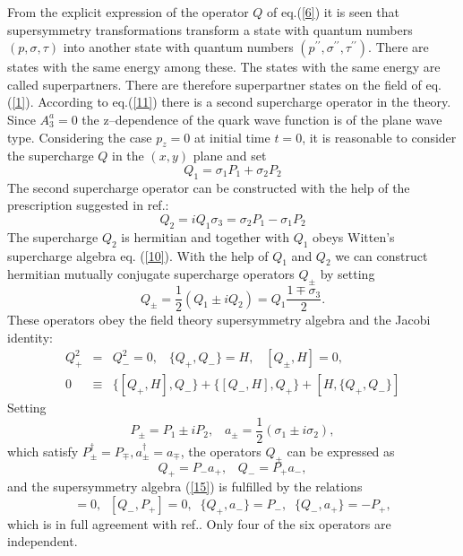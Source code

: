 \documentclass[a4paper,12pt,a4]{article}
\begin{document}
From the explicit expression of the operator $Q$  of eq.(\ref{6})
it is seen that supersymmetry transformations
transform a state with quantum numbers
$(p, \sigma, \tau)$ into another state with
quantum numbers $(p^{\prime\prime}, \sigma^{\prime\prime},
 \tau^{\prime\prime})$. There are states with the same energy among these.
The states with the same energy
are called superpartners.
There are therefore superpartner states on the field of
eq.(\ref{1}).
According to eq.(\ref{11}) there is a second
supercharge operator in the theory.
Since $A^a_3=0$ the z--dependence of the quark wave
function is of the plane wave type. Considering
the case $p_z = 0$ at initial time $t=0$, 
 it is reasonable to consider the supercharge $Q$
in the $(x, y)$ plane and set
\begin{equation}
Q_1=\sigma_1P_1 + \sigma_2 P_2
\label{13}
\end{equation}
The second supercharge operator can be constructed with the
help of the prescription suggested in ref.\cite{2}:
\begin{equation}
Q_2=iQ_1\sigma_3=\sigma_2P_1-\sigma_1P_2
\label{14}
\end{equation}
The supercharge $Q_2$ is hermitian and
together with $Q_1$ obeys Witten's
supercharge algebra eq. (\ref{10}).
With the help of $Q_1$ and $Q_2$ we can construct 
hermitian mutually conjugate supercharge
operators $Q_{\pm}$ by setting
\begin{equation}
Q_{\pm}=\frac{1}{2}(Q_1\pm iQ_2)=Q_1\frac{1\mp \sigma_3}{2}.
\label{15}
\end{equation}
These operators obey the field theory supersymmetry
algebra\cite{11} and the Jacobi identity:
\begin{eqnarray}
Q^2_+ &=& Q^2_- = 0, \;\;\; \{Q_+, Q_-\}=H,\;\;\; [Q_{\pm}, H] = 0,\nonumber\\
0&\equiv &\{[Q_+,H], Q_-\} +\{[Q_-,H], Q_+\} +[H, \{Q_+,Q_-\}]
\label{16}
\end{eqnarray}
Setting
$$
P_{\pm} = P_1\pm iP_2, \;\;\;a_{\pm}=\frac{1}{2}(\sigma_1 \pm i\sigma_2),
$$
which satisfy $P^{\dagger}_{\pm}=P_{\mp}, a^{\dagger}_{\pm}=a_{\mp}$, 
the operators $Q_{\pm}$ can be expressed as
\begin{equation}
Q_+=P_-a_+, \;\;\; Q_-=P_+a_-,
\label{17}
\end{equation}
and the supersymmetry algebra (\ref{15}) is
fulfilled by the relations
\begin{equation}
[Q_+, P_-]=0, \;\;[Q_-, P_+]=0, \;\;\{Q_+, a_-\}=P_-,
\;\;\{Q_-, a_+\}=-P_+,
\label{18}
\end{equation}
which is in full agreement with ref.\cite{11}.
Only four of the six operators are independent.
\end{document}

